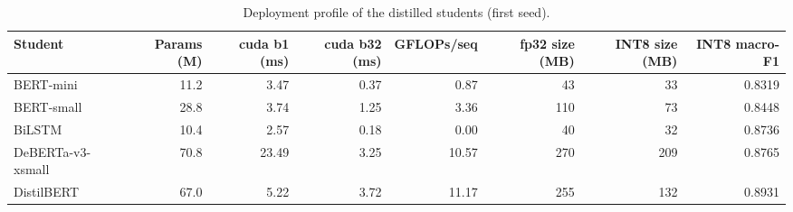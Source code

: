 \begin{table}[t]
\centering
\caption{Deployment profile of the distilled students (first seed).}
\label{tab:efficiency}
\begin{tabular}{lrrrrrrr}
\toprule
Student & Params (M) & cuda b1 (ms) & cuda b32 (ms) & GFLOPs/seq & fp32 size (MB) & INT8 size (MB) & INT8 macro-F1 \\
\midrule
BERT-mini & 11.2 & 3.47 & 0.37 & 0.87 & 43 & 33 & 0.8319 \\
BERT-small & 28.8 & 3.74 & 1.25 & 3.36 & 110 & 73 & 0.8448 \\
BiLSTM & 10.4 & 2.57 & 0.18 & 0.00 & 40 & 32 & 0.8736 \\
DeBERTa-v3-xsmall & 70.8 & 23.49 & 3.25 & 10.57 & 270 & 209 & 0.8765 \\
DistilBERT & 67.0 & 5.22 & 3.72 & 11.17 & 255 & 132 & 0.8931 \\
\bottomrule
\end{tabular}
\end{table}